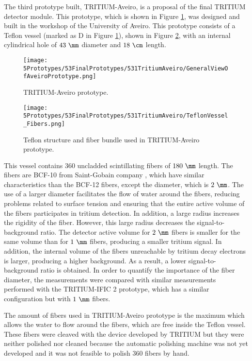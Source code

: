 The third prototype built, TRITIUM-Aveiro, is a proposal of the final TRITIUM detector module. This prototype, which is shown in Figure \ref{fig:TritiumAveiro0}, was designed and built in the workshop of the University of Aveiro. This prototype consists of a Teflon vessel (marked as D in Figure \ref{fig:TritiumAveiro0}), shown in Figure \ref{fig:TeflonStructureFibersTritiumAveiro0}, with an internal cylindrical hole of $43~\mm$ diameter and $18~\cm$ length.

\begin{figure}[h]
\centering
\texttt{[image: 5Prototypes/53FinalPrototypes/531TritiumAveiro/GeneralViewOfAveiroPrototype.png]}
\caption{TRITIUM-Aveiro prototype.\label{fig:TritiumAveiro0}}
\end{figure}
 
\begin{figure}[h]
\centering
\texttt{[image: 5Prototypes/53FinalPrototypes/531TritiumAveiro/TeflonVessel\_Fibers.png]}
\caption{Teflon structure and fiber bundle used in TRITIUM-Aveiro prototype.\label{fig:TeflonStructureFibersTritiumAveiro0}}
\end{figure}
This vessel contains $360$ uncladded scintillating fibers of $180~\mm$ length. The fibers are BCF-10 from Saint-Gobain company \cite{DataSheetBCF10Fiber}, which have similar characteristics than the BCF-12 fibers, except the diameter, which is $2~\mm$. The use of a larger diameter facilitates the flow of water around the fibers, reducing problems related to surface tension and ensuring that the entire active volume of the fibers participates in tritium detection. In addition, a large radius increases the rigidity of the fiber. However, this large radius decreases the signal-to-background ratio. The detector active volume for $2~\mm$ fibers is smaller for the same volume than for $1~\mm$ fibers, producing a smaller tritium signal. In addition, the internal volume of the fibers unreachable by tritium decay electrons is larger, producing a higher background. As a result, a lower signal-to-background ratio is obtained. In order to quantify the importance of the fiber diameter, the measurements were compared with similar measurements performed with the TRITIUM-IFIC 2 prototype, which has a similar configuration but with $1~\mm$ fibers.

The amount of fibers used in TRITIUM-Aveiro prototype is the maximum which allows the water to flow around the fibers, which are free inside the Teflon vessel. These fibers were cleaved with the device developed by TRITIUM but they were neither polished nor cleaned because the automatic polishing machine was not yet developed and it was not feasible to polish 360 fibers by hand. 

